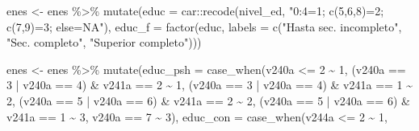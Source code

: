 \documentclass[
]{book}
\newenvironment{Shaded}{\begin{snugshade}}{\end{snugshade}}
\newcommand{\AttributeTok}[1]{\textcolor[rgb]{0.77,0.63,0.00}{#1}}
\newcommand{\DecValTok}[1]{\textcolor[rgb]{0.00,0.00,0.81}{#1}}
\newcommand{\FunctionTok}[1]{\textcolor[rgb]{0.00,0.00,0.00}{#1}}
\newcommand{\NormalTok}[1]{#1}
\newcommand{\OtherTok}[1]{\textcolor[rgb]{0.56,0.35,0.01}{#1}}
\newcommand{\SpecialCharTok}[1]{\textcolor[rgb]{0.00,0.00,0.00}{#1}}
\newcommand{\StringTok}[1]{\textcolor[rgb]{0.31,0.60,0.02}{#1}}
\begin{document}
\begin{Shaded}
\begin{Highlighting}[]
\NormalTok{enes }\OtherTok{\textless{}{-}}\NormalTok{ enes }\SpecialCharTok{\%\textgreater{}\%} 
    \FunctionTok{mutate}\NormalTok{(}\AttributeTok{educ =}\NormalTok{ car}\SpecialCharTok{::}\FunctionTok{recode}\NormalTok{(nivel\_ed, }\StringTok{"0:4=1; c(5,6,8)=2; c(7,9)=3; else=NA"}\NormalTok{),}
                 \AttributeTok{educ\_f =} \FunctionTok{factor}\NormalTok{(educ, }\AttributeTok{labels =} \FunctionTok{c}\NormalTok{(}\StringTok{"Hasta sec. incompleto"}\NormalTok{, }\StringTok{"Sec. completo"}\NormalTok{, }\StringTok{"Superior completo"}\NormalTok{)))}

\NormalTok{enes }\OtherTok{\textless{}{-}}\NormalTok{ enes }\SpecialCharTok{\%\textgreater{}\%} 
    \FunctionTok{mutate}\NormalTok{(}\AttributeTok{educ\_psh =} \FunctionTok{case\_when}\NormalTok{(v240a }\SpecialCharTok{\textless{}=} \DecValTok{2} \SpecialCharTok{\textasciitilde{}} \DecValTok{1}\NormalTok{,}
\NormalTok{                                                            (v240a }\SpecialCharTok{==} \DecValTok{3} \SpecialCharTok{|}\NormalTok{ v240a }\SpecialCharTok{==} \DecValTok{4}\NormalTok{) }\SpecialCharTok{\&}\NormalTok{ v241a }\SpecialCharTok{==} \DecValTok{2} \SpecialCharTok{\textasciitilde{}} \DecValTok{1}\NormalTok{,}
\NormalTok{                                                            (v240a }\SpecialCharTok{==} \DecValTok{3} \SpecialCharTok{|}\NormalTok{ v240a }\SpecialCharTok{==} \DecValTok{4}\NormalTok{) }\SpecialCharTok{\&}\NormalTok{ v241a }\SpecialCharTok{==} \DecValTok{1} \SpecialCharTok{\textasciitilde{}} \DecValTok{2}\NormalTok{,}
\NormalTok{                                                            (v240a }\SpecialCharTok{==} \DecValTok{5} \SpecialCharTok{|}\NormalTok{ v240a }\SpecialCharTok{==} \DecValTok{6}\NormalTok{) }\SpecialCharTok{\&}\NormalTok{ v241a }\SpecialCharTok{==} \DecValTok{2} \SpecialCharTok{\textasciitilde{}} \DecValTok{2}\NormalTok{,}
\NormalTok{                                                            (v240a }\SpecialCharTok{==} \DecValTok{5} \SpecialCharTok{|}\NormalTok{ v240a }\SpecialCharTok{==} \DecValTok{6}\NormalTok{) }\SpecialCharTok{\&}\NormalTok{ v241a }\SpecialCharTok{==} \DecValTok{1} \SpecialCharTok{\textasciitilde{}} \DecValTok{3}\NormalTok{,}
\NormalTok{                                                            v240a }\SpecialCharTok{==} \DecValTok{7} \SpecialCharTok{\textasciitilde{}} \DecValTok{3}\NormalTok{),}
                 \AttributeTok{educ\_con =} \FunctionTok{case\_when}\NormalTok{(v244a }\SpecialCharTok{\textless{}=} \DecValTok{2} \SpecialCharTok{\textasciitilde{}} \DecValTok{1}\NormalTok{,}

\end{Highlighting}
\end{Shaded}
\end{document}
